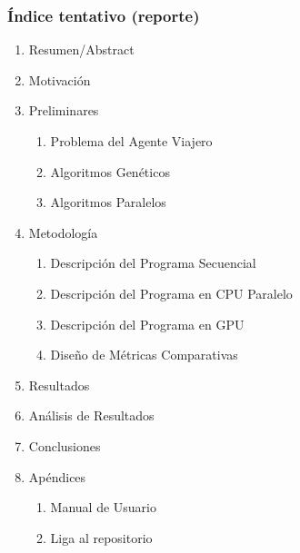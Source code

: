 \documentclass{article}
\begin{document}
\begin{titlepage}
\begin{centering}
\begin{minipage}{3in}
\begin{center}
            \subsubsection*{Índice tentativo (reporte)}
            {\footnotesize
            \begin{enumerate}
                \item Resumen/Abstract
                \item Motivación
                \item Preliminares
                    \begin{enumerate}[label=\roman* ]
                        \item Problema del Agente Viajero
                        \item Algoritmos Genéticos
                        \item Algoritmos Paralelos
                    \end{enumerate}
                \item Metodología
                    \begin{enumerate}[label=\roman* ]
                        \item Descripción del Programa Secuencial
                        \item Descripción del Programa en CPU Paralelo
                        \item Descripción del Programa en GPU
                        \item Diseño de Métricas Comparativas
                    \end{enumerate}
                \item Resultados
                \item Análisis de Resultados
                \item Conclusiones
                \item Apéndices
                    \begin{enumerate}[label=\roman* ]
                        \item Manual de Usuario
                        \item Liga al repositorio
                    \end{enumerate}
            \end{enumerate}
            }
            \end{center}
        \end{minipage}
        \begin{minipage}{3in}
            \begin{center}

\end{center}
\end{minipage}
\end{centering}
\end{titlepage}
\end{document}
